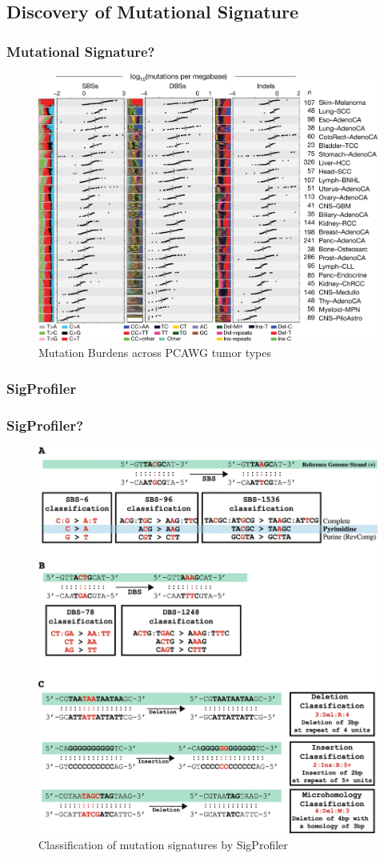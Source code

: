 \documentclass{beamer}
\begin{document}
    \subsection{Discovery of Mutational Signature}
    \begin{frame}
        \frametitle{Mutational Signature?}

        \begin{figure}
            \includegraphics[width=0.6 \linewidth]{figures/LungCancer/signatures.jpg}
            \caption{Mutation Burdens across PCAWG tumor types \protect\cite{signature1}}
        \end{figure}
    \end{frame}

    \subsubsection{SigProfiler}
    \begin{frame}
        \frametitle{SigProfiler?}

        \begin{figure}
            \includegraphics[width=0.4 \linewidth]{figures/Workflow/SigProfiler.jpg}
            \caption{Classification of mutation signatures by SigProfiler \protect\cite{SigProfiler1, SigProfiler2, SigProfiler3}}
        \end{figure}
    \end{frame}
\end{document}
